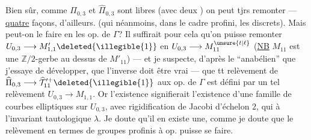 
Bien sûr, comme $\Pi_{0,3}$ et $\widehat\Pi_{0,3}$ sont libres (avec deux ) on peut tjrs remonter ---  \uline{quatre} façons, d'ailleurs. (qui néanmoins, dans le cadre profini,  les  discrets). Mais peut-on le faire en  les op. de $\Gamma$? Il suffirait pour cela qu'on puisse remonter $U_{0,3}\longrightarrow M'_{1,1}\deleted{\illegible{1}}$ en $U_{0,3}\longrightarrow M_{11}^{\unsure{t|\ell}}$ (\uline{NB} $M_{11}$ est une  $\mathbb Z/2$-gerbe au dessus de $M'_{11}$) --- et je suspecte, 
d'après le  ``anabélien'' que j'essaye de développer, que l'inverse doit être vrai --- que tt relèvement de $\widehat\Pi_{0,3}\longrightarrow\widehat{\mathcal T}_{11}^{\prime+}\deleted{\illegible{1}}$  aux op. de $\Gamma$ est défini par un tel relèvement $U_{0,3}\longrightarrow M_{1,1}$. Or l'existence  signifierait  l'existence d'une famille de courbes elliptiques sur $U_{0,3}$, avec
rigidification de Jacobi d'échelon $2$, qui  à l'invariant tautologique $\lambda$. Je doute qu'il en existe une, comme je doute que le relèvement en termes de groupes profinis à op. puisse se faire.

